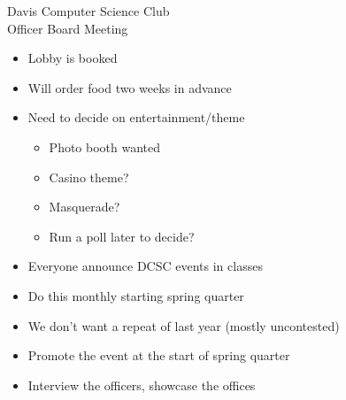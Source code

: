 \documentclass{article}
\begin{document}
\begin{Minutes}{Davis Computer Science Club\\Officer Board Meeting}
\begin{itemize}
\item Lobby is booked
\item Will order food two weeks in advance
\item Need to decide on entertainment/theme
  \begin{itemize}
  \item Photo booth wanted
  \item Casino theme?
  \item Masquerade?
  \item Run a poll later to decide?
  \end{itemize}
\end{itemize}

\begin{itemize}
\item Everyone announce DCSC events in classes
\item Do this monthly starting spring quarter
\end{itemize}

\begin{itemize}
\item We don't want a repeat of last year (mostly uncontested)
\item Promote the event at the start of spring quarter
\item Interview the officers, showcase the offices
\end{itemize}
\thispagestyle{creditfooter}
\end{Minutes}
\end{document}
